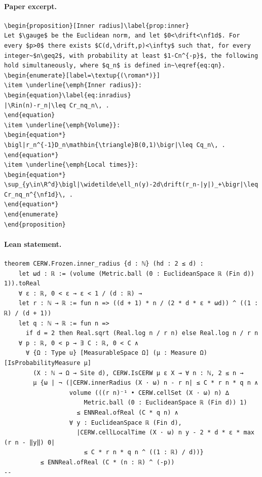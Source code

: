 \paragraph{Paper excerpt.}
\begin{verbatim}
\begin{proposition}[Inner radius]\label{prop:inner}
Let $\gauge$ be the Euclidean norm, and let $0<\drift<\nf1d$. For every $p>0$ there exists $C(d,\drift,p)<\infty$ such that, for every integer~$n\geq2$, with probability at least $1-Cn^{-p}$, the following hold simultaneously, where $q_n$ is defined in~\eqref{eq:qn}.
\begin{enumerate}[label=\textup{(\roman*)}]
\item \underline{\emph{Inner radius}}:
\begin{equation}\label{eq:inradius}
|\Rin(n)-r_n|\leq Cr_nq_n\, .
\end{equation}
\item \underline{\emph{Volume}}:
\begin{equation*}
\bigl|r_n^{-1}D_n\mathbin{\triangle}B(0,1)\bigr|\leq Cq_n\, .
\end{equation*}
\item \underline{\emph{Local times}}:
\begin{equation*}
\sup_{y\in\R^d}\bigl|\widetilde\ell_n(y)-2d\drift(r_n-|y|)_+\bigr|\leq Cr_nq_n^{\nf1d}\, .
\end{equation*}
\end{enumerate}
\end{proposition}
\end{verbatim}
\paragraph{Lean statement.}
\begin{verbatim}
theorem CERW.Frozen.inner_radius {d : ℕ} (hd : 2 ≤ d) :
    let ωd : ℝ := (volume (Metric.ball (0 : EuclideanSpace ℝ (Fin d)) 1)).toReal
    ∀ ε : ℝ, 0 < ε → ε < 1 / (d : ℝ) →
    let r : ℕ → ℝ := fun n => ((d + 1) * n / (2 * d * ε * ωd)) ^ ((1 : ℝ) / (d + 1))
    let q : ℕ → ℝ := fun n =>
      if d = 2 then Real.sqrt (Real.log n / r n) else Real.log n / r n
    ∀ p : ℝ, 0 < p → ∃ C : ℝ, 0 < C ∧
      ∀ {Ω : Type u} [MeasurableSpace Ω] (μ : Measure Ω) [IsProbabilityMeasure μ]
        (X : ℕ → Ω → Site d), CERW.IsCERW μ ε X → ∀ n : ℕ, 2 ≤ n →
        μ {ω | ¬ (|CERW.innerRadius (X · ω) n - r n| ≤ C * r n * q n ∧
                  volume (((r n)⁻¹ • CERW.cellSet (X · ω) n) ∆
                      Metric.ball (0 : EuclideanSpace ℝ (Fin d)) 1)
                    ≤ ENNReal.ofReal (C * q n) ∧
                  ∀ y : EuclideanSpace ℝ (Fin d),
                    |CERW.cellLocalTime (X · ω) n y - 2 * d * ε * max (r n - ‖y‖) 0|
                      ≤ C * r n * q n ^ ((1 : ℝ) / d))}
          ≤ ENNReal.ofReal (C * (n : ℝ) ^ (-p))
--
\end{verbatim}
